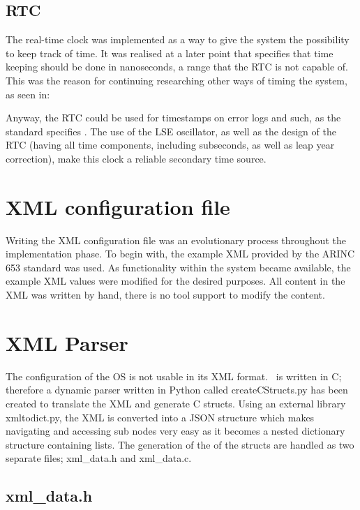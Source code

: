 \subsection{RTC}
The real-time clock was implemented as a way to give the system the
possibility to keep track of time. It was realised at a later point
that \arinc{} specifies that time keeping should be done in nanoseconds,
a range that the RTC is not capable of. This was the reason for continuing 
researching other ways of timing the system, as seen in:

Anyway, the RTC could be used for timestamps on error logs and such,
as the standard specifies \cite{page_26}. The use of the LSE oscillator,
as well as the design of the RTC (having all time components, including
subseconds, as well as leap year correction), make this clock a reliable
secondary time source.

\section{XML configuration file}

Writing the XML configuration file was an evolutionary process throughout the implementation phase. To begin with, the example XML provided by the ARINC 653 standard was used. As functionality within the system became available, the example XML values were modified for the desired purposes. All content in the XML was written by hand, there is no tool support to modify the content.

\section{XML Parser}

The configuration of the OS is not usable in its XML format. \OSname\ is written in C; therefore a dynamic parser written in Python called createCStructs.py has been created to translate the XML and generate C structs.
Using an external library xmltodict.py, the XML is converted into a JSON structure which makes navigating and accessing sub nodes very easy as it becomes a nested dictionary structure containing lists.
The generation of the of the structs are handled as two separate files; xml\_data.h and xml\_data.c. 

\subsection{xml\_data.h}

